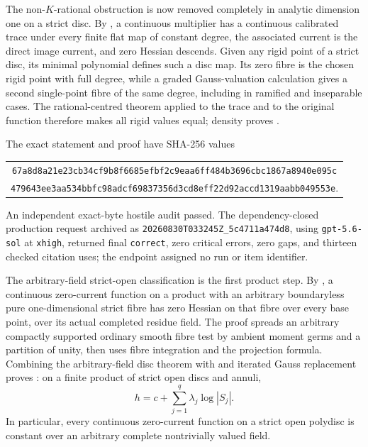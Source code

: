 The non-\(K\)-rational obstruction is now removed completely in analytic
dimension one on a strict disc.  By
, a continuous multiplier has a
continuous calibrated trace under every finite flat map of constant degree,
the associated current is the direct image current, and zero Hessian
descends.  Given any rigid point of a strict disc, its minimal polynomial
defines such a disc map.  Its zero fibre is the chosen rigid point with full
degree, while a graded Gauss-valuation calculation gives a second
single-point fibre of the same degree, including in ramified and inseparable
cases.  The rational-centred theorem applied to the trace and to the original
function therefore makes all rigid values equal; density proves
.

The exact statement and proof have SHA-256 values
\begin{center}
\small
\begin{tabular}{@{}c@{}}
\nolinkurl{67a8d8a21e23cb34cf9b8f6685efbf2c9eaa6ff484b3696cbc1867a8940e095c}\\
\nolinkurl{479643ee3aa534bbfc98adcf69837356d3cd8eff22d92accd1319aabb049553e}.
\end{tabular}
\end{center}
An independent exact-byte hostile audit passed.  The dependency-closed
production request archived as
\nolinkurl{20260830T033245Z_5c4711a474d8}, using
\texttt{gpt-5.6-sol} at \texttt{xhigh}, returned final
\texttt{correct}, zero critical errors, zero gaps, and thirteen checked
citation uses; the endpoint assigned no run or item identifier.

The arbitrary-field strict-open classification is the first product step.
By
, a continuous
zero-current function on a product with an arbitrary boundaryless pure
one-dimensional strict fibre has zero Hessian on that fibre over every base
point, over its actual completed residue field.  The proof spreads an
arbitrary compactly supported ordinary smooth fibre test by ambient moment
germs and a partition of unity, then uses fibre integration and the
projection formula.  Combining the arbitrary-field disc theorem with
 and iterated Gauss
replacement proves
: on a finite product
of strict open discs and annuli,
\[
                    h=c+\sum_{j=1}^{q}\lambda_j\log|S_j|.
\]
In particular, every continuous zero-current function on a strict open
polydisc is constant over an arbitrary complete nontrivially valued field.

